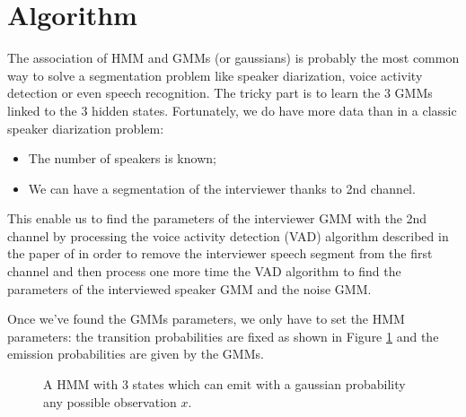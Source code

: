 \documentclass{techrep} %
\begin{document}
\section{Algorithm}

The association of HMM and GMMs (or gaussians) is probably the
most common way to solve a segmentation problem like speaker
diarization, voice activity detection or even speech recognition.  The
tricky part is to learn the 3 GMMs linked to the 3 hidden states.
Fortunately, we do have more data than in a classic speaker
diarization problem:
\begin{itemize}
\item The number of speakers is known;
\item We can have a segmentation of the interviewer thanks to 2nd
  channel.
\end{itemize}
This enable us to find the parameters of the interviewer GMM with the
2nd channel by processing the voice activity detection (VAD) algorithm
described in the paper of \cite{CRIM} in order to remove the
interviewer speech segment from the first channel and then process one more
time the VAD algorithm to find the parameters of the interviewed
speaker GMM and the noise GMM.

Once we've found the GMMs parameters, we only have to set the HMM
parameters: the transition probabilities are fixed as shown in Figure
\ref{hmmgmm} and the emission probabilities are given by the GMMs.

\begin{figure}[H]
  \begin{center}
  \end{center}
  \label{hmmgmm}
  \caption{A HMM with 3 states which can emit with a gaussian probability any possible observation $x$.}
\end{figure}
\end{document}
